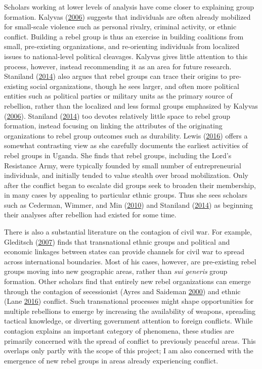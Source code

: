 \documentclass[12pt,]{book}
\theoremstyle{definition}
\theoremstyle{definition}
\theoremstyle{remark}
\begin{document}
Scholars working at lower levels of analysis have come closer to
explaining group formation. Kalyvas
(\protect\hyperlink{ref-Kalyvas2006}{2006}) suggests that individuals
are often already mobilized for small-scale violence such as personal
rivalry, criminal activity, or ethnic conflict. Building a rebel group
is thus an exercise in building coalitions from small, pre-existing
organizations, and re-orienting individuals from localized issues to
national-level political cleavages. Kalyvas gives little attention to
this process, however, instead recommending it as an area for future
research. Staniland (\protect\hyperlink{ref-Staniland2014}{2014}) also
argues that rebel groups can trace their origins to pre-existing social
organizations, though he sees larger, and often more political entities
such as political parties or military units as the primary source of
rebellion, rather than the localized and less formal groups emphasized
by Kalyvas (\protect\hyperlink{ref-Kalyvas2006}{2006}). Staniland
(\protect\hyperlink{ref-Staniland2014}{2014}) too devotes relatively
little space to rebel group formation, instead focusing on linking the
attributes of the originating organizations to rebel group outcomes such
as durability. Lewis (\protect\hyperlink{ref-Lewis2016}{2016}) offers a
somewhat contrasting view as she carefully documents the earliest
activities of rebel groups in Uganda. She finds that rebel groups,
including the Lord's Resistance Army, were typically founded by small
number of entrepreneurial individuals, and initially tended to value
stealth over broad mobilization. Only after the conflict began to
escalate did groups seek to broaden their membership, in many cases by
appealing to particular ethnic groups. Thus she sees scholars such as
Cederman, Wimmer, and Min (\protect\hyperlink{ref-Cederman2010}{2010})
and Staniland (\protect\hyperlink{ref-Staniland2014}{2014}) as beginning
their analyses after rebellion had existed for some time.

There is also a substantial literature on the contagion of civil war.
For example, Gleditsch (\protect\hyperlink{ref-Gleditsch2007}{2007})
finds that transnational ethnic groups and political and economic
linkages between states can provide channels for civil war to spread
across international boundaries. Most of his cases, however, are
pre-existing rebel groups moving into new geographic areas, rather than
\emph{sui generis} group formation. Other scholars find that entirely
new rebel organizations can emerge through the contagion of secessionist
(Ayres and Saideman \protect\hyperlink{ref-Ayres2000}{2000}) and ethnic
(Lane \protect\hyperlink{ref-Lane2016}{2016}) conflict. Such
transnational processes might shape opportunities for multiple
rebellions to emerge by increasing the availability of weapons,
spreading tactical knowledge, or diverting government attention to
foreign conflicts. While contagion explains an important category of
phenomena, these studies are primarily concerned with the spread of
conflict to previously peaceful areas. This overlaps only partly with
the scope of this project; I am also concerned with the emergence of new
rebel groups in areas already experiencing conflict.
\end{document}
